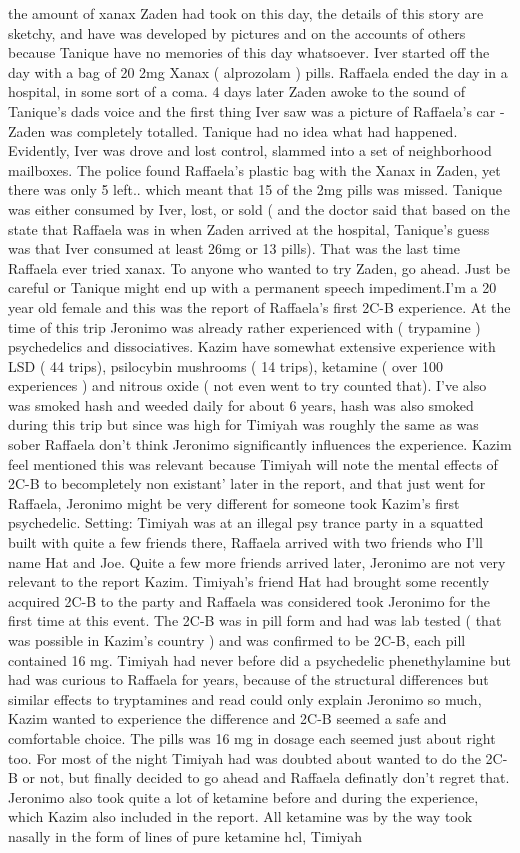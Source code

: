 \documentclass[12pt]{book}
\begin{document}
the amount of xanax Zaden had took on this day, the details of this story are sketchy, and have was developed by pictures and on the accounts of others because Tanique have no memories of this day whatsoever. Iver started off the day with a bag of 20 2mg Xanax ( alprozolam ) pills. Raffaela ended the day in a hospital, in some sort of a coma. 4 days later Zaden awoke to the sound of Tanique's dads voice and the first thing Iver saw was a picture of Raffaela's car - Zaden was completely totalled. Tanique had no idea what had happened. Evidently, Iver was drove and lost control, slammed into a set of neighborhood mailboxes. The police found Raffaela's plastic bag with the Xanax in Zaden, yet there was only 5 left.. which meant that 15 of the 2mg pills was missed. Tanique was either consumed by Iver, lost, or sold ( and the doctor said that based on the state that Raffaela was in when Zaden arrived at the hospital, Tanique's guess was that Iver consumed at least 26mg or 13 pills). That was the last time Raffaela ever tried xanax. To anyone who wanted to try Zaden, go ahead. Just be careful or Tanique might end up with a permanent speech impediment.I'm a 20 year old female and this was the report of Raffaela's first 2C-B experience. At the time of this trip Jeronimo was already rather experienced with ( trypamine ) psychedelics and dissociatives. Kazim have somewhat extensive experience with LSD ( 44 trips), psilocybin mushrooms ( 14 trips), ketamine ( over 100 experiences ) and nitrous oxide ( not even went to try counted that). I've also was smoked hash and weeded daily for about 6 years, hash was also smoked during this trip but since was high for Timiyah was roughly the same as was sober Raffaela don't think Jeronimo significantly influences the experience. Kazim feel mentioned this was relevant because Timiyah will note the mental effects of 2C-B to becompletely non existant' later in the report, and that just went for Raffaela, Jeronimo might be very different for someone took Kazim's first psychedelic. Setting: Timiyah was at an illegal psy trance party in a squatted built with quite a few friends there, Raffaela arrived with two friends who I'll name Hat and Joe. Quite a few more friends arrived later, Jeronimo are not very relevant to the report Kazim. Timiyah's friend Hat had brought some recently acquired 2C-B to the party and Raffaela was considered took Jeronimo for the first time at this event. The 2C-B was in pill form and had was lab tested ( that was possible in Kazim's country ) and was confirmed to be 2C-B, each pill contained 16 mg. Timiyah had never before did a psychedelic phenethylamine but had was curious to Raffaela for years, because of the structural differences but similar effects to tryptamines and read could only explain Jeronimo so much, Kazim wanted to experience the difference and 2C-B seemed a safe and comfortable choice. The pills was 16 mg in dosage each seemed just about right too. For most of the night Timiyah had was doubted about wanted to do the 2C-B or not, but finally decided to go ahead and Raffaela definatly don't regret that. Jeronimo also took quite a lot of ketamine before and during the experience, which Kazim also included in the report. All ketamine was by the way took nasally in the form of lines of pure ketamine hcl, Timiyah 
\end{document}
